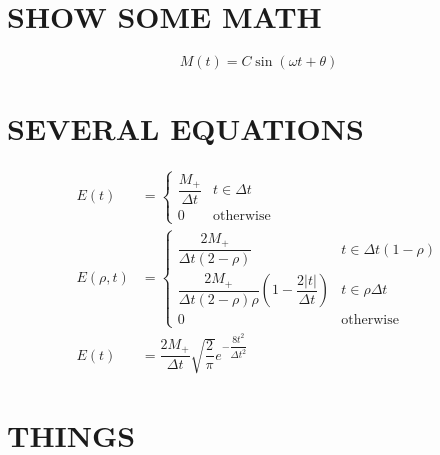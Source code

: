 \documentclass{article}
\newcommand{\Mp}{\ensuremath{{M_{+}}}}
\newcommand{\Dt}{\ensuremath{\Delta t}}
\begin{document}
\section{SHOW SOME MATH}
$$
M(t) = C\sin(\omega t+\theta)
$$

\section{SEVERAL EQUATIONS}
\begin{align*}
E(t) &= \begin{cases}
        \dfrac{\Mp}{\Dt} & t \in \Dt \\
        0 & \textrm{otherwise}
        \end{cases}\tag{Step} \\
E(\rho, t) &= \begin{cases}
        \dfrac{2\Mp}{\Dt(2-\rho)} & t \in \Dt(1-\rho) \\
        \dfrac{2\Mp}{\Dt(2-\rho)\rho}\left(1-\dfrac{2|t|}{\Dt}\right) & t \in \rho\Dt \\
        0 & \textrm{otherwise}
        \end{cases}\tag{Modified Step} \\
E(t) &= \dfrac{2\Mp}{\Dt}\sqrt{\dfrac{2}{\pi}}e^{-\dfrac{8t^2}{\Dt^2}}\tag{Approximate $\delta$}
\end{align*}


\section{THINGS}
\end{document}
